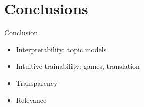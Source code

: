 \documentclass[compress]{beamer}
\begin{document}
\section{Conclusions}

\begin{frame}{Conclusion}

  \begin{itemize}
    \item Interpretability: topic models
    \item Intuitive trainability: games, translation
    \item Transparency
    \item Relevance
  \end{itemize}

\end{frame}













\end{document}
